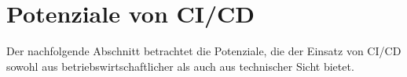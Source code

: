 \section{Potenziale von CI/CD}
\label{Potenziale von CI/CD}
Der nachfolgende Abschnitt betrachtet die Potenziale, die der Einsatz von \acrshort{CI}/\acrshort{CD} sowohl aus betriebswirtschaftlicher als auch aus technischer Sicht bietet.